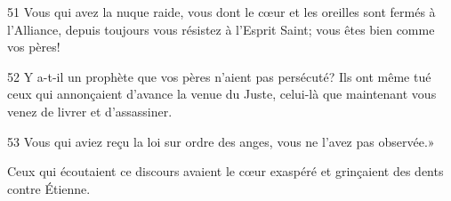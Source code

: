 51 Vous qui avez la nuque raide, vous dont le cœur et les oreilles sont fermés à l’Alliance, depuis toujours vous résistez à l’Esprit Saint; vous êtes bien comme vos pères!

52 Y a-t-il un prophète que vos pères n’aient pas persécuté? Ils ont même tué ceux qui annonçaient d’avance la venue du Juste, celui-là que maintenant vous venez de livrer et d’assassiner.

53 Vous qui aviez reçu la loi sur ordre des anges, vous ne l’avez pas observée.»

Ceux qui écoutaient ce discours avaient le cœur exaspéré
	et grinçaient des dents contre Étienne.
